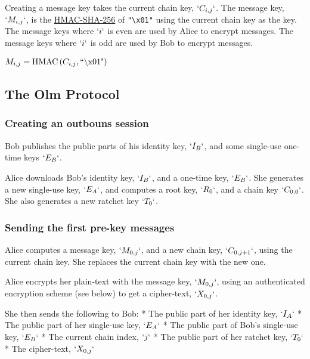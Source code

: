 \documentclass[10pt]{article}
\begin{document}
Creating a message key takes the current chain key, \(`C_{i,j}`\). The
message key, \(`M_{i,j}`\), is the
\href{https://tools.ietf.org/html/rfc2104}{HMAC-SHA-256} of
\texttt{"\textbackslash{}x01"} using the current chain key as the key.
The message keys where \(`i`\) is even are used by Alice to encrypt
messages. The message keys where \(`i`\) is odd are used by Bob to
encrypt messages.

$\begin{aligned}
    M_{i,j}&=\operatorname{HMAC}\left(C_{i,j},\text{``\char`\\x01"}\right)
\end{aligned}$

\subsection{The Olm Protocol}\label{the-olm-protocol}

\subsubsection{Creating an outbouns session}\label{creating-an-outbound-session}

Bob publishes the public parts of his identity key, \(`I_B`\), and some
single-use one-time keys \(`E_B`\).

Alice downloads Bob's identity key, \(`I_B`\), and a one-time key,
\(`E_B`\). She generates a new single-use key, \(`E_A`\), and computes a
root key, \(`R_0`\), and a chain key \(`C_{0,0}`\). She also generates a
new ratchet key \(`T_0`\).

\subsubsection{Sending the first pre-key messages}\label{sending-the-first-pre-key-messages}

Alice computes a message key, \(`M_{0,j}`\), and a new chain key,
\(`C_{0,j+1}`\), using the current chain key. She replaces the current
chain key with the new one.

Alice encrypts her plain-text with the message key, \(`M_{0,j}`\), using
an authenticated encryption scheme (see below) to get a cipher-text,
\(`X_{0,j}`\).

She then sends the following to Bob: * The public part of her identity
key, \(`I_A`\) * The public part of her single-use key, \(`E_A`\) * The
public part of Bob's single-use key, \(`E_B`\) * The current chain
index, \(`j`\) * The public part of her ratchet key, \(`T_0`\) * The
cipher-text, \(`X_{0,j}`\)
\end{document}
